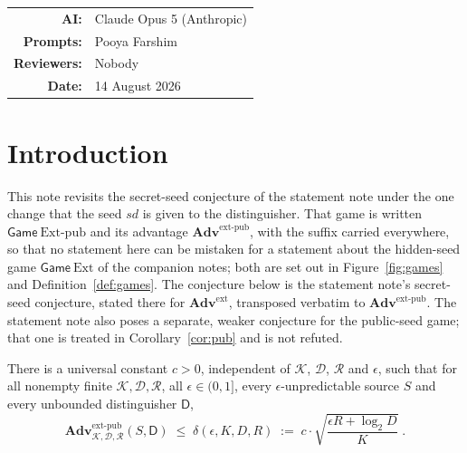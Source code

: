 \documentclass{conjura-solution}
\makeatletter
\newcommand{\Adv}{\mathbf{Adv}}
\newcommand{\Gm}{\mathsf{Game}}
\newcommand{\Ext}{\mathrm{Ext}}
\newcommand{\Extp}{\mathrm{Ext}\text{-}\mathrm{pub}}
\newcommand{\ext}{\mathrm{ext}}
\newcommand{\extp}{\mathrm{ext}\text{-}\mathrm{pub}}
\newcommand{\sd}{\mathit{sd}}
\newcommand{\calK}{\mathcal{K}}
\newcommand{\calD}{\mathcal{D}}
\newcommand{\calR}{\mathcal{R}}
\theoremstyle{cjplain}
\newcommand{\AIModelsUsed}{Claude Opus 5 (Anthropic)}
\newcommand{\PromptedBy}{Pooya Farshim}
\newcommand{\ReviewedBy}{Nobody}
\newcommand{\PaperDate}{14 August 2026}
\newcommand{\AIDisclosure}{%
  \begingroup
  \small\centering
  \begin{tabular}{@{}rl@{}}
    \textbf{AI:} & \AIModelsUsed \\
    \textbf{Prompts:} & \PromptedBy \\
    \textbf{Reviewers:} & \ReviewedBy \\
    \textbf{Date:} & \PaperDate \\
  \end{tabular}
  \par
  \endgroup
}
\makeatother
\begin{document}

\vspace{0.6em}
\AIDisclosure
\vspace{1em}

\section{Introduction}\label{sec:intro}

This note revisits the secret-seed conjecture of the statement note under the one change that the
seed $\sd$ is given to the distinguisher. That game is written $\Gm\ \Extp$ and its advantage
$\Adv^{\extp}$, with the suffix carried everywhere, so that no statement here can be mistaken for
a statement about the hidden-seed game $\Gm\ \Ext$ of the companion notes; both are set out in
Figure~\ref{fig:games} and Definition~\ref{def:games}. The conjecture below is the statement
note's secret-seed conjecture, stated there for $\Adv^{\ext}$, transposed verbatim to
$\Adv^{\extp}$. The statement note also poses a separate, weaker conjecture for the public-seed
game; that one is treated in Corollary~\ref{cor:pub} and is not refuted.

\begin{conjecture}\label{conj:main}
There is a universal constant $c > 0$, independent of $\calK$, $\calD$, $\calR$ and $\epsilon$, such
that for all nonempty finite $\calK, \calD, \calR$, all $\epsilon \in (0,1]$, every
$\epsilon$-unpredictable source $S$ and every unbounded distinguisher $\mathsf{D}$,
\[
  \Adv^{\extp}_{\calK,\calD,\calR}(S,\mathsf{D})
  \;\le\; \delta(\epsilon,K,D,R)
  \;:=\; c \cdot \sqrt{\frac{\epsilon R + \log_2 D}{K}} \; .
\]
\end{conjecture}
\end{document}
